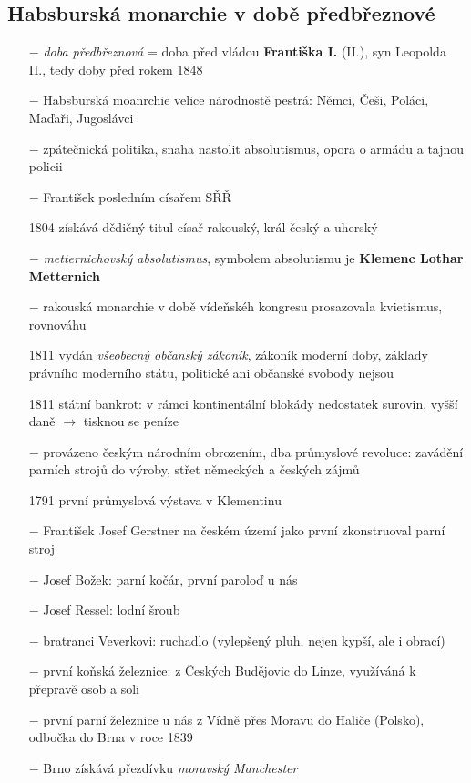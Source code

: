 \documentclass{article}
\begin{document}
\subsection*{Habsburská monarchie v době předbřeznové}
\begin{itemize}
    \vspace{-0.5em}
    \setlength\itemsep{0.15em}
    \item[$-$] \textit{doba předbřeznová} = doba před vládou \textbf{Františka I.} (II.), syn Leopolda II., tedy doby před rokem 1848
    \item[$-$] Habsburská moanrchie velice národnostě pestrá: Němci, Češi, Poláci, Maďaři, Jugoslávci
    \item[$-$] zpátečnická politika, snaha nastolit absolutismus, opora o armádu a tajnou policii
    \item[$-$] František posledním císařem SŘŘ
    \item[1804] získává dědičný titul císař rakouský, král český a uherský
    \item[$-$] \textit{metternichovský absolutismus}, symbolem absolutismu je \textbf{Klemenc Lothar Metternich}
    \item[$-$] rakouská monarchie v době vídeňskéh kongresu prosazovala kvietismus, rovnováhu
    \item[1811] vydán \textit{všeobecný občanský zákoník}, zákoník moderní doby, základy právního moderního státu, politické ani občanské svobody nejsou
    \item[1811] státní bankrot: v rámci kontinentální blokády nedostatek surovin, vyšší daně $\rightarrow$ tisknou se peníze
    \item[$-$] provázeno českým národním obrozením, dba průmyslové revoluce: zavádění parních strojů do výroby, střet německých a českých zájmů
    \item[1791] první průmyslová výstava v Klementinu
    \item[$-$] František Josef Gerstner na českém území jako první zkonstruoval parní stroj
    \item[$-$] Josef Božek: parní kočár, první paroloď u nás
    \item[$-$] Josef Ressel: lodní šroub
    \item[$-$] bratranci Veverkovi: ruchadlo (vylepšený pluh, nejen kypší, ale i obrací)
    \item[$-$] první koňská železnice: z Českých Budějovic do Linze, využíváná k přepravě osob a soli
    \item[$-$] první parní železnice u nás z Vídně přes Moravu do Haliče (Polsko), odbočka do Brna v roce 1839
    \item[$-$] Brno získává přezdívku \textit{moravský Manchester}
\end{itemize}
\end{document}
